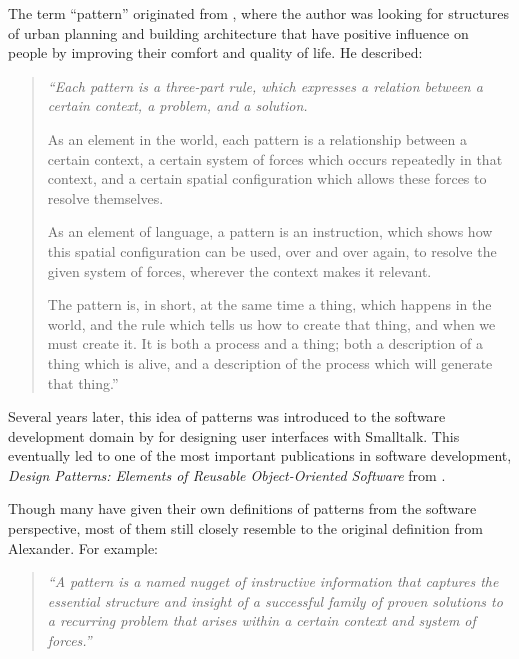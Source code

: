 \documentclass[a4paper,titlepage]{article}
\begin{document}
The term ``pattern'' originated from \citet{timeless:alexander}, where
the author was looking for structures of urban planning and building
architecture that have positive influence on people by improving their
comfort and quality of life. He described:
\begin{quote}
  {\it ``Each pattern is a three-part rule, which expresses a relation
    between a certain context, a problem, and a solution.

    As an element in the world, each pattern is a relationship between
    a certain context, a certain system of forces which occurs
    repeatedly in that context, and a certain spatial configuration
    which allows these forces to resolve themselves.

    As an element of language, a pattern is an instruction, which
    shows how this spatial configuration can be used, over and over
    again, to resolve the given system of forces, wherever the context
    makes it relevant.

    The pattern is, in short, at the same time a thing, which happens
    in the world, and the rule which tells us how to create that
    thing, and when we must create it. It is both a process and a
    thing; both a description of a thing which is alive, and a
    description of the process which will generate that thing.''}

  \raggedleft \citep[p.~247]{timeless:alexander}
\end{quote}

Several years later, this idea of patterns was introduced to the
software development domain by \citet{patterns:beck} for designing
user interfaces with Smalltalk. This eventually led to one of the most
important publications in software development, \textit{Design
  Patterns: Elements of Reusable Object-Oriented Software} from
\citet{patterns:gamma}.

Though many have given their own definitions of patterns from the
software perspective, most of them still closely resemble to the
original definition from Alexander. For example:
\begin{quote}
  {\it ``A pattern is a named nugget of instructive information that
    captures the essential structure and insight of a successful
    family of proven solutions to a recurring problem that arises
    within a certain context and system of forces.''}

  \raggedleft \citet{patterns:appleton}
\end{quote}
\end{document}
